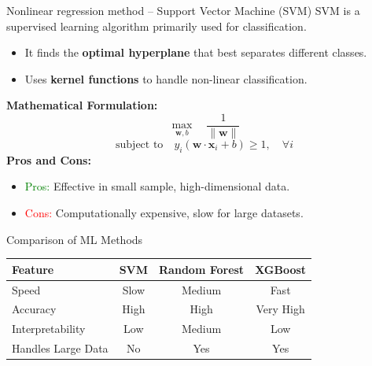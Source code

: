 \documentclass{beamer}
\begin{document}
    \begin{frame}{Nonlinear regression method -- Support Vector Machine (SVM)}
    SVM is a supervised learning algorithm primarily used for classification.  
        \begin{itemize}
            \item It finds the \textbf{optimal hyperplane} that best separates different classes.
            \item Uses \textbf{kernel functions} to handle non-linear classification.
        \end{itemize}
        \vspace{0.3cm}
        \textbf{Mathematical Formulation:}  
        \[
            \max_{\mathbf{w}, b} \quad \frac{1}{\|\mathbf{w}\|} 
        \]
        \[
            \text{subject to} \quad y_i (\mathbf{w} \cdot \mathbf{x}_i + b) \geq 1, \quad \forall i
        \]
        \vspace{0.3cm}
        \textbf{Pros and Cons:}  
        \begin{itemize}
            \item \textcolor{green}{Pros:} Effective in small sample, high-dimensional data.
            \item \textcolor{red}{Cons:} Computationally expensive, slow for large datasets.
        \end{itemize}
    \end{frame}
    \begin{frame}{Comparison of ML Methods}
        \begin{table}[]
            \centering
            \begin{tabular}{lccc}
                \toprule
                Feature & SVM & Random Forest & XGBoost \\
                \midrule
                Speed & Slow & Medium & Fast \\
                Accuracy & High & High & Very High \\
                Interpretability & Low & Medium & Low \\
                Handles Large Data & No & Yes & Yes \\
                \bottomrule
            \end{tabular}
        \end{table}
    \end{frame}
    
\end{document}
